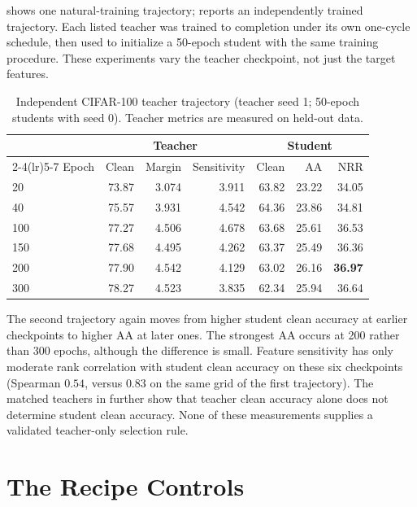  shows one natural-training trajectory; 
reports an independently trained trajectory. Each listed teacher was trained to completion under
its own one-cycle schedule, then used to initialize a 50-epoch student with the same training
procedure. These experiments vary the teacher checkpoint, not just the target features.

\begin{table}[!htbp]
  \centering \small \setlength{\tabcolsep}{4pt}
  \caption{Independent CIFAR-100 teacher trajectory (teacher seed 1; 50-epoch students with
  seed 0). Teacher metrics are measured on held-out data.}
  \label{tab:teacherladder_seed1}
  \begin{tabular}{lrrrrrr}
    \toprule
    & \multicolumn{3}{c}{Teacher} & \multicolumn{3}{c}{Student} \\
    \cmidrule(lr){2-4}\cmidrule(lr){5-7}
    Epoch & Clean & Margin & Sensitivity & Clean & AA & NRR \\
    \midrule
    20       & 73.87 & 3.074 & 3.911 & 63.82 & 23.22 & 34.05 \\
    40       & 75.57 & 3.931 & 4.542 & 64.36 & 23.86 & 34.81 \\
    100      & 77.27 & 4.506 & 4.678 & 63.68 & 25.61 & 36.53 \\
    150      & 77.68 & 4.495 & 4.262 & 63.37 & 25.49 & 36.36 \\
    200      & 77.90 & 4.542 & 4.129 & 63.02 & 26.16 & \textbf{36.97} \\
    300      & 78.27 & 4.523 & 3.835 & 62.34 & 25.94 & 36.64 \\
    \bottomrule
  \end{tabular}
\end{table}

The second trajectory again moves from higher student clean accuracy at earlier checkpoints to
higher AA at later ones. The strongest AA occurs at 200 rather than 300 epochs, although the
difference is small. Feature sensitivity has only moderate rank correlation with student clean
accuracy on these six checkpoints (Spearman $0.54$, versus $0.83$ on the same grid of the first
trajectory). The matched teachers in  further show that teacher clean
accuracy alone does not determine student clean accuracy. None of these measurements supplies a
validated teacher-only selection rule.

\section{The Recipe Controls}
\label{app:recipe}

